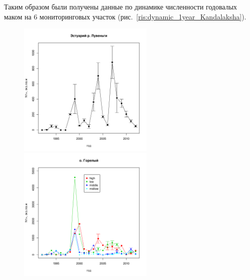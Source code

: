 Таким образом были получены данные по динамике численности годовалых маком на 6 мониторинговых участок (рис.~\ref{ris:dynamic_1year_Kandalaksha}).
	\begin{figure}[h]
	
	\begin{minipage}[b]{.46\linewidth}
	\begin{center}
	\includegraphics[width=65mm]{../White_Sea/Estuatiy_Luvenga/Estuary_N_oneyear.pdf}

	\end{center}
	\end{minipage}
	\hfil %
	\begin{minipage}[b]{.46\linewidth}
	\begin{center}
		\includegraphics[width=65mm]{../White_Sea/Luvenga_Goreliy/Goreliy_N_oneyear.pdf}
	\end{center}
	\end{minipage}




\end{figure}
